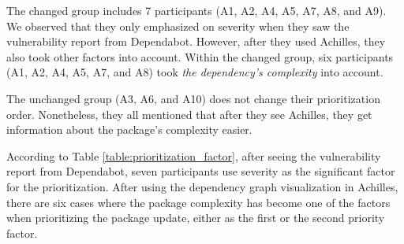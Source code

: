 \documentclass[conference]{IEEEtran}
\begin{document}
	The changed group includes 7 participants (A1, A2, A4, A5, A7, A8, and A9). We observed that they only emphasized on severity when they saw the vulnerability report from Dependabot. However, after they used Achilles, they also took other factors into account. Within the changed group, six participants (A1, A2, A4, A5, A7, and A8) took \textit{the dependency's complexity} into account. 
	
	The unchanged group (A3, A6, and A10) does not change their prioritization order. Nonetheless, they all mentioned that after they see Achilles, they get information about the package's complexity easier.
	
	According to Table \ref{table:prioritization_factor}, after seeing the vulnerability report from Dependabot, seven participants use severity as the significant factor for the prioritization. After using the dependency graph visualization in Achilles, there are six cases where the package complexity has become one of the factors when prioritizing the package update, either as the first or the second priority factor.
	
\end{document}
